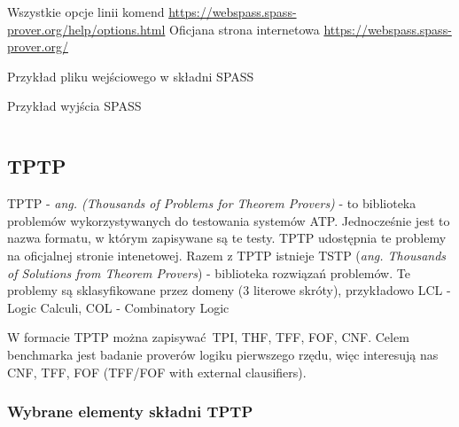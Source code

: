 \documentclass[a4paper,12pt]{article}
\newenvironment{longlisting}{\captionsetup{type=listing}}{}
\begin{document}
\noindent
Wszystkie opcje linii komend \url{https://webspass.spass-prover.org/help/options.html}
\noindent \newline
Oficjana strona internetowa \url{https://webspass.spass-prover.org/}

\begin{longlisting}
  \caption{Przykład pliku wejściowego w składni SPASS}
\end{longlisting}

\begin{longlisting}
  \caption{Przykład wyjścia SPASS}
  \inputminted{text}{listings/spass_example.out}
\end{longlisting}

\subsection{TPTP}

TPTP - \textit{ang. (Thousands of Problems for Theorem Provers)} - to biblioteka problemów wykorzystywanych do testowania systemów \gls{ATP}. Jednocześnie jest to nazwa formatu, w którym zapisywane są te testy. TPTP udostępnia te problemy na oficjalnej stronie intenetowej. Razem z TPTP istnieje TSTP (\textit{ang. Thousands of Solutions from Theorem Provers}) - biblioteka rozwiązań problemów.
Te problemy są sklasyfikowane przez domeny (3 literowe skróty), przykładowo LCL - Logic Calculi, COL - Combinatory Logic

W formacie TPTP można zapisywać \gls{TPI}, \gls{THF}, \gls{TFF}, \gls{FOF}, \gls{CNF}. Celem benchmarka jest badanie proverów logiku pierwszego rzędu, więc interesują nas \gls{CNF}, \gls{TFF}, \gls{FOF} (TFF/FOF with external clausifiers).

\subsubsection{Wybrane elementy składni TPTP}
\end{document}
